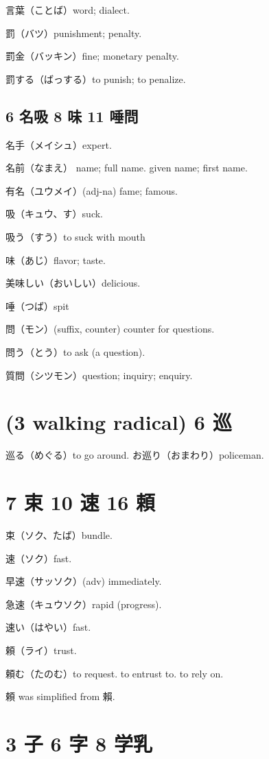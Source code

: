 言葉（ことば）word; dialect.

罰（バツ）punishment; penalty.

罰金（バッキン）fine; monetary penalty.

罰する（ばっする）to punish; to penalize.

\subsection{6 名吸 8 味 11 唾問}

名手（メイシュ）expert.

名前（なまえ）
name; full name.
given name; first name.

有名（ユウメイ）(adj-na) fame; famous.

吸（キュウ、す）suck.

吸う（すう）to suck with mouth

味（あじ）flavor; taste.

美味しい（おいしい）delicious.

唾（つば）spit

問（モン）(suffix, counter) counter for questions.

問う（とう）to ask (a question).

質問（シツモン）question; inquiry; enquiry.

\section{(3 walking radical) 6 巡}

巡る（めぐる）to go around.
お巡り（おまわり）policeman.

\section{7 束 10 速 16 頼}

束（ソク、たば）bundle.

速（ソク）fast.

早速（サッソク）(adv) immediately.

急速（キュウソク）rapid (progress).

速い（はやい）fast.

頼（ライ）trust.

頼む（たのむ）to request. to entrust to. to rely on.

頼 was simplified from 賴.

\section{3 子 6 字 8 学乳}

